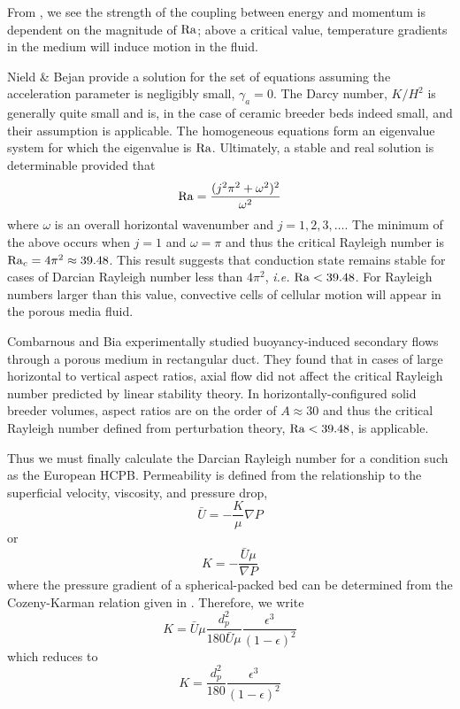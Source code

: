 From , we see the strength of the coupling between energy and momentum is dependent on the magnitude of $\mathrm{Ra}$; above a critical value, temperature gradients in the medium will induce motion in the fluid.

Nield \& Bejan provide a solution for the set of equations  assuming the acceleration parameter is negligibly small, $\gamma_a = 0$.\cite{Nield2013} The Darcy number, $K/H^2$ is generally quite small and is, in the case of ceramic breeder beds indeed small, and their assumption is applicable. The homogeneous equations form an eigenvalue system for which the eigenvalue is $\mathrm{Ra}$. Ultimately, a stable and real solution is determinable provided that 
\begin{equation}\label{eq:rayleigh-eigen}
\mathrm{Ra} = \frac{(j^2\pi^2 + \omega^2)^2}{\omega^2}
\end{equation}
where $\omega$ is an overall horizontal wavenumber and $j = 1, 2, 3, \dots$.\cite{Nield2013} The minimum of the above occurs when $j = 1$ and $\omega = \pi$ and thus the critical Rayleigh number is $\mathrm{Ra}_c = 4\pi^2 \approx 39.48$. This result suggests that conduction state remains stable for cases of Darcian Rayleigh number less than $4\pi^2$, \textit{i.e.} $\mathrm{Ra} < 39.48$. For Rayleigh numbers larger than this value, convective cells of cellular motion will appear in the porous media fluid.

Combarnous and Bia experimentally studied buoyancy-induced secondary flows through a porous medium in rectangular duct.\cite{Combarnous} They found that in cases of large horizontal to vertical aspect ratios, axial flow did not affect the critical Rayleigh number predicted by linear stability theory. In horizontally-configured solid breeder volumes, aspect ratios are on the order of $A \approx 30$ and thus the critical Rayleigh number defined from perturbation theory, $\mathrm{Ra} < 39.48$, is applicable.

Thus we must finally calculate the Darcian Rayleigh number for a condition such as the European HCPB. Permeability is defined from the relationship to the superficial velocity, viscosity, and pressure drop,
\begin{equation}
\bar{U} = -\frac{K}{\mu}\nabla P
\end{equation}
or
\begin{equation}
K = -\frac{\bar{U}\mu}{\nabla P}
\end{equation}
where the pressure gradient of a spherical-packed bed can be determined from the Cozeny-Karman relation given in . Therefore, we write
\begin{equation}\label{eq:permeability}
K = \bar{U}\mu\frac{d_p^2}{180 \bar{U} \mu} \frac{\epsilon^3}{(1-\epsilon)^2}
\end{equation}
which reduces to
\begin{equation}
K = \frac{d_p^2}{180} \frac{\epsilon^3}{(1-\epsilon)^2}
\end{equation}

